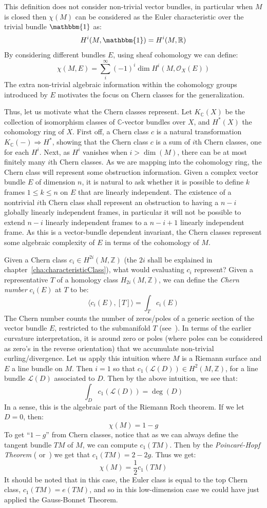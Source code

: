 \documentclass{ut-thesis}
\newcommand{\R}{{\mathbb{R}}}
\newcommand{\Z}{{\mathbb{Z}}}
\newcommand{\C}{{\mathbb{C}}}
\newcommand{\CL}{{\mathcal{L}}}
\newcommand{\CO}{{\mathcal{O}}}
\renewcommand{\deg}{{\operatorname{deg}}}
\newcommand{\Rw}{\Rightarrow}
\begin{document}
This definition does not consider non-trivial vector bundles, in particular when $M$ is closed then $\chi(M)$
can be considered as the Euler characteristic over the trivial bundle $\mathbbm{1}$ as:
\[
  H^i(M, \mathbbm{1}) = H^i(M, \R)
\]
By considering different bundles $E$, using sheaf cohomology we can define:
\[
  \chi(M, E) = \sum_i^\infty (-1)^i \dim H^i(M, \CO_X(E))
\]
The extra non-trivial algebraic information within the cohomology groups introduced by $E$ motivates the focus on Chern
classes for the generalization.


Thus, let us motivate what the Chern classes represent. Let $K_\C(X)$ be the collection of isomorphism classes
of $\C$-vector bundles over $X$, and $H^*(X)$ the cohomology ring of $X$. First off, a Chern class $c$ is a
natural transformation $K_\C(-) \Rw H^*$, showing that the Chern class $c$ is a sum of $i$th Chern classes,
one for each $H^i$. Next, as $H^i$ vanishes when $i > \dim(M)$, there can be at most finitely many $i$th Chern
classes. As we are mapping into the cohomology ring, the Chern class will represent some obstruction
information. Given a complex vector bundle $E$ of dimension $n$, it is natural to ask whether it is possible to
define $k$ frames $1\le k \le n$ on $E$ that are linearly independent. The existence of a nontrivial $i$th
Chern class shall represent an obstruction to having a $n-i$ globally linearly independent
frames, in particular it will not be possible to extend $n-i$ linearly independent frames to a $n-i+1$
linearly independent frame. As this is a vector-bundle dependent invariant, the Chern classes represent some
algebraic complexity of $E$ in terms of the cohomology of $M$.

Given a Chern class $c_i \in H^{2i}(M, \Z)$ (the $2i$ shall be explained in
chapter~\ref{cha:characteristicClass}), what would evaluating $c_i$ represent? Given a representative $T$ of
a homology class $H_{2i}(M, \Z)$, we can define the \emph{Chern number} $c_i(E)$ at $T$ to be:
\[
  \langle c_i(E), [T] \rangle = \int_T c_i(E)
\]
The Chern number counts the number of zeros/poles of a generic section of the vector bundle $E$, restricted to the
submanifold $T$ (see~\cite{NateKTheory}). In terms of the earlier curvature interpretation, it is around
zero or poles (where poles can be considered as zero's in the reverse orientation) that we accumulate non-trivial
curling/divergence. Let us apply this intuition where $M$ is a Riemann surface and $E$ a line bundle on $M$.
Then $i = 1$ so that $c_1(\CL(D)) \in H^2(M, \Z)$, for a line bundle $\CL(D)$ associated to $D$. Then by the
above intuition, we see that:
\[
  \int_D c_1(\CL(D)) = \deg(D)
\]
In a sense, this is the algebraic part of the Riemann Roch theorem. If we let $D = 0$, then:
\[
  \chi(M) = 1-g
\]
To get ``$1-g$'' from Chern classes, notice that as we can always define the tangent bundle $TM$ of
$M$, we can compute $c_1(TM)$. Then by the \emph{Poincar\'e-Hopf Theorem} (\cite{NateAlgTop}
or~\cite{NateDiffGeo}) we get that $c_1(TM) = 2-2g$. Thus we get:
\[
  \chi(M) = \frac{1}{2}c_1(TM)
\]
It should be noted that in this case, the Euler class is equal to the top Chern class, $c_1(TM) = e(TM)$, and
so in this low-dimension case we could have just applied the Gauss-Bonnet Theorem.
\end{document}
